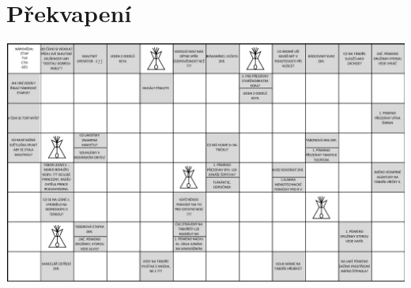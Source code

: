 \chapter{Překvapení} %
\label{cha:křížovka}

\begin{center}

\vspace{-20pt}

\includegraphics[angle=270,origin=c,height=0.7\textheight]{img/krizovka.pdf}
\end{center}
